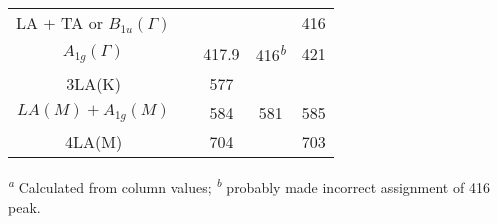 \begin{table}
\begin{tabular}{ccccc}
     LA + TA \cite{Sourisseau1991} or $B_{1u}(\Gamma)$\cite{Staiger2012}  &      &       &   &  416 \\
          $A_{1g}(\Gamma)$   &      & 417.9                        & 416\textsuperscript{\emph{b}} &  421\\
               3LA(K)        &      & 577                          &              &      \\
       $ LA(M)+ A_{1g}(M)$   &      & 584                          & 581          &  585 \\
    4LA(M)                   &      & 704                          &              &  703\\
    \bottomrule
  \end{tabular}

  \textsuperscript{\emph{a}} Calculated from column values;
  \textsuperscript{\emph{b}} \citeauthor{JMR7990865} probably made incorrect assignment of 416 peak.\cite{JMR7990865}
\end{table}

